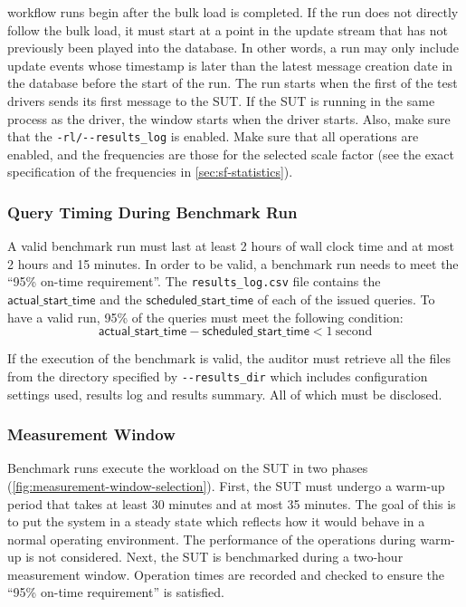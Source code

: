 \begin{description}
        workflow runs begin after the bulk load is completed. If the run does not directly follow the bulk load, it must
        start at a point in the update stream that has not previously been played into the database. In other words, a run
        may only include update events whose timestamp is later than the latest message creation date in the database before
        the start of the run. The run starts when the first of the test drivers sends its first message to the SUT. If the
        SUT is running in the same process as the driver, the window starts when the driver starts. Also, make sure that
        the \verb|-rl/--results_log| is enabled. Make sure that all operations are enabled, and the frequencies are
        those for the selected scale factor (see the exact specification of the frequencies in
        \autoref{sec:sf-statistics}).
\end{description}

\subsubsection{Query Timing During Benchmark Run}
\label{sec:ontime-requirements}
A valid benchmark run must last at least 2 hours of wall clock time and at most 2 hours and 15 minutes.
In order to be valid, a benchmark run needs to meet the ``95\% on-time requirement''.
The \texttt{results\_log.csv} file contains the $\mathsf{actual\_start\_time}$ and the $\mathsf{scheduled\_start\_time}$ of each of the issued queries. To have a valid run, 95\% of the queries must meet the following condition:
\begin{equation*}
    \mathsf{actual\_start\_time} - \mathsf{scheduled\_start\_time} < 1\
    \mathrm{second}
\end{equation*}

If the execution of the benchmark is valid, the auditor must retrieve all the files from the directory specified by
\verb|--results_dir| which includes configuration settings used, results log and results summary. All of which must be
disclosed.

\subsubsection{Measurement Window}
\label{sec:transaction-workload-measurement-window}

Benchmark runs execute the workload on the SUT in two phases (\autoref{fig:measurement-window-selection}). First, the
SUT must undergo a warm-up period that takes at least 30 minutes and at most 35 minutes. The goal of this is to put the
system in a steady state which reflects how it would behave in a normal operating environment. The performance of the
operations during warm-up is not considered. Next, the SUT is benchmarked during a two-hour measurement window.
Operation times are recorded and checked to ensure the ``95\% on-time requirement'' is satisfied.

